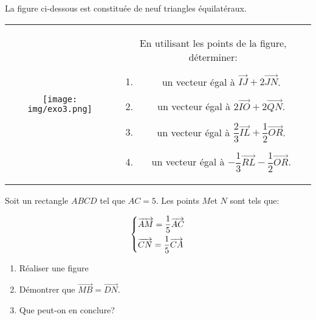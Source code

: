 \documentclass[a4paper]{article}
\begin{document}
  \begin{exercice}{}{}
    La figure ci-dessous est constituée de neuf triangles équilatéraux.
  
    \begin{tabular}{cc}
      \begin{minipage}{7cm}
  
        \begin{center}
          \texttt{[image: img/exo3.png]}
          \end{center}
      \end{minipage}&
      \begin{minipage}{10cm}
  
        En utilisant les points de la figure, déterminer:
        \begin{enumerate}
          \item un vecteur égal à $\overrightarrow{IJ}+2\overrightarrow{JN}$.
          \item un vecteur égal à $2\overrightarrow{IO}+2\overrightarrow{QN}$.
          \item un vecteur égal à $\dfrac{2}{3}\overrightarrow{IL}+\dfrac{1}{2}\overrightarrow{OR}$.
          \item un vecteur égal à $-\dfrac{1}{3}\overrightarrow{RL}-\dfrac{1}{2}\overrightarrow{OR}$.
        \end{enumerate}
      \end{minipage}\\
    \end{tabular}
  \end{exercice}
  
  \medskip
  \begin{exercice}{}{}
  
      Soit un rectangle $ABCD$ tel que $AC = 5$. Les points $M$et $N$ sont tels que:
   
   $$\begin{dcases}
    \overrightarrow{AM}=\dfrac{1}{5}\overrightarrow{AC}\\
    \overrightarrow{CN}=\dfrac{1}{5}\overrightarrow{CA}
   \end{dcases}$$
   \begin{enumerate}
       \item Réaliser une figure
       \item Démontrer que $\overrightarrow{MB}=\overrightarrow{DN}$.
       \item Que peut-on en conclure?
   \end{enumerate}
  
      
  \end{exercice}
  \medskip
  
\end{document}
